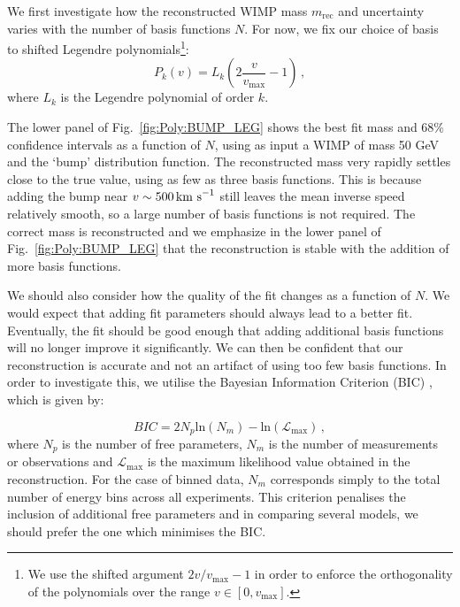 We first investigate how the reconstructed WIMP mass $m_\textrm{rec}$ and uncertainty varies with the number of basis functions $N$. For now, we fix our choice of basis to shifted Legendre polynomials\footnote{We use the shifted argument $2v/v_\textrm{max} - 1$ in order to enforce the orthogonality of the polynomials over the range $v \in [0, v_\textrm{max}]$.}:
\begin{equation}
P_k(v) = L_k\left(2\frac{v}{v_\textrm{max}} - 1\right)\,,
\end{equation}
where $L_k$ is the Legendre polynomial of order $k$.

The lower panel of Fig.~\ref{fig:Poly:BUMP_LEG} shows the best fit mass and 68\% confidence intervals as a function of $N$, using as input a WIMP of mass 50 GeV and the `bump' distribution function. The reconstructed mass very rapidly settles close to the true value, using as few as three basis functions. This is because adding the bump near $v \sim 500 \,\textrm{km s}^{-1}$ still leaves the mean inverse speed relatively smooth, so a large number of basis functions is not required. The correct mass is reconstructed and we emphasize in the lower panel of Fig.~\ref{fig:Poly:BUMP_LEG} that the reconstruction is stable with the addition of more basis functions.

We should also consider how the quality of the fit changes as a function of $N$. We would expect that adding fit parameters should always lead to a better fit. Eventually, the fit should be good enough that adding additional basis functions will no longer improve it significantly. We can then be confident that our reconstruction is accurate and not an artifact of using too few basis functions. In order to investigate this, we utilise the Bayesian Information Criterion (BIC) \cite{Schwarz:1978}, which is given by:

\begin{equation}
BIC = 2N_p\textrm{ln}(N_m) - \textrm{ln}(\mathcal{L}_\textrm{max}) \, ,
\end{equation}
where $N_p$ is the number of free parameters, $N_m$ is the number of measurements or observations and $\mathcal{L}_\textrm{max}$ is the maximum likelihood value obtained in the reconstruction. For the case of binned data, $N_m$ corresponds simply to the total number of energy bins across all experiments. This criterion penalises the inclusion of additional free parameters and in comparing several models, we should prefer the one which minimises the BIC.

